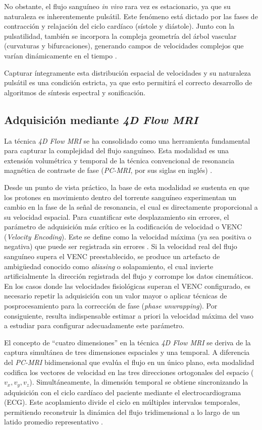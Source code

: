 No obstante, el flujo sanguíneo \textit{in vivo} rara vez es estacionario, ya que su naturaleza es inherentemente pulsátil. Este fenómeno está dictado por las fases de contracción y relajación del ciclo cardíaco (sístole y diástole). Junto con la pulsatilidad, también se incorpora la compleja geometría del árbol vascular (curvaturas y bifurcaciones), generando campos de velocidades complejos que varían dinámicamente en el tiempo \cite{Ku1997}.

Capturar íntegramente esta distribución espacial de velocidades y su naturaleza pulsátil es una condición estricta, ya que esto permitirá el correcto desarrollo de algoritmos de síntesis espectral y sonificación.

\subsection{Adquisición mediante \textit{4D Flow MRI}}

La técnica \textit{4D Flow MRI} se ha consolidado como una herramienta fundamental para capturar la complejidad del flujo sanguíneo. Esta modalidad es una extensión volumétrica y temporal de la técnica convencional de resonancia magnética de contraste de fase (\textit{PC-MRI}, por sus siglas en inglés) \cite{markl2012_4dflow}.

Desde un punto de vista práctico, la base de esta modalidad se sustenta en que los protones en movimiento dentro del torrente sanguíneo experimentan un cambio en la fase de la señal de resonancia, el cual es directamente proporcional a su velocidad espacial. Para cuantificar este desplazamiento sin errores, el parámetro de adquisición más crítico es la codificación de velocidad o VENC (\textit{Velocity Encoding}). Este se define como la velocidad máxima (ya sea positiva o negativa) que puede ser registrada sin errores \cite{pineda2016_4dflow}. Si la velocidad real del flujo sanguíneo supera el VENC preestablecido, se produce un artefacto de ambigüedad conocido como \textit{aliasing} o solapamiento, el cual invierte artificialmente la dirección registrada del flujo y corrompe los datos cinemáticos. En los casos donde las velocidades fisiológicas superan el VENC configurado, es necesario repetir la adquisición con un valor mayor o aplicar técnicas de posprocesamiento para la corrección de fase (\textit{phase unwrapping}). Por consiguiente, resulta indispensable estimar a priori la velocidad máxima del vaso a estudiar para configurar adecuadamente este parámetro.

El concepto de ``cuatro dimensiones'' en la técnica \textit{4D Flow MRI} se deriva de la captura simultánea de tres dimensiones espaciales y una temporal. A diferencia del \textit{PC-MRI} bidimensional que evalúa el flujo en un único plano, esta modalidad codifica los vectores de velocidad en las tres direcciones ortogonales del espacio ($v_x, v_y, v_z$). Simultáneamente, la dimensión temporal se obtiene sincronizando la adquisición con el ciclo cardíaco del paciente mediante el electrocardiograma (ECG). Este acoplamiento divide el ciclo en múltiples intervalos temporales, permitiendo reconstruir la dinámica del flujo tridimensional a lo largo de un latido promedio representativo \cite{pineda2016_4dflow,markl2012_4dflow}.

